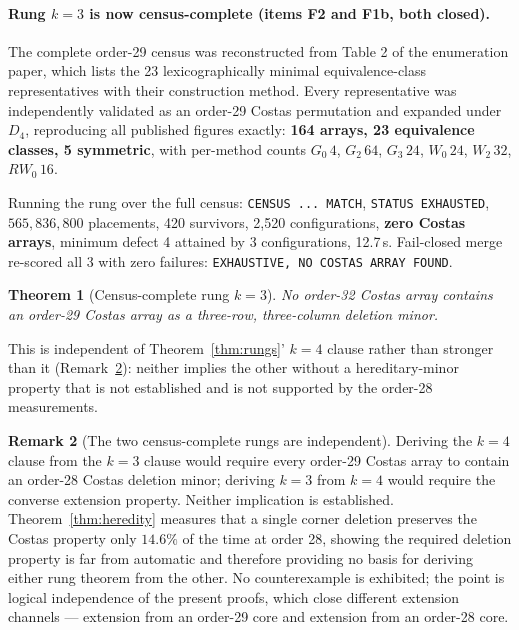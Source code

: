 \documentclass[11pt,a4paper]{article}
\newtheorem{theorem}{Theorem}[section]
\theoremstyle{definition}
\newtheorem{remark}[theorem]{Remark}
\begin{document}
\paragraph{Rung $k=3$ is now census-complete (items F2 and F1b, both closed).}
The complete order-29 census was reconstructed from Table 2 of the enumeration
paper, which lists the 23 lexicographically minimal equivalence-class
representatives with their construction method. Every representative was
independently validated as an order-29 Costas permutation and expanded under
$D_4$, reproducing all published figures exactly: \textbf{164 arrays, 23
equivalence classes, 5 symmetric}, with per-method counts
$G_0\,4$, $G_2\,64$, $G_3\,24$, $W_0\,24$, $W_2\,32$, $RW_0\,16$.

Running the rung over the full census: \texttt{CENSUS ... MATCH}, \texttt{STATUS
EXHAUSTED}, $565{,}836{,}800$ placements, 420 survivors, 2{,}520 configurations,
\textbf{zero Costas arrays}, minimum defect 4 attained by 3 configurations,
12.7\,s. Fail-closed merge re-scored all 3 with zero failures:
\texttt{EXHAUSTIVE, NO COSTAS ARRAY FOUND}.

\begin{theorem}[Census-complete rung $k=3$]
\label{thm:rung3census}
No order-32 Costas array contains an order-29 Costas array as a three-row,
three-column deletion minor.
\end{theorem}

This is independent of Theorem~\ref{thm:rungs}' $k=4$ clause rather than stronger
than it (Remark~\ref{rem:independent}): neither implies the other without a
hereditary-minor property that is not established and is not supported by the
order-28 measurements.

\begin{remark}[The two census-complete rungs are independent]
\label{rem:independent}
Deriving the $k=4$ clause from the $k=3$ clause would require every order-29
Costas array to contain an order-28 Costas deletion minor; deriving $k=3$ from
$k=4$ would require the converse extension property. Neither implication is
established. Theorem~\ref{thm:heredity} measures that a single corner deletion
preserves the Costas property only $14.6\%$ of the time at order 28, showing the
required deletion property is far from automatic and therefore providing no basis
for deriving either rung theorem from the other. No counterexample is exhibited;
the point is logical independence of the present proofs, which close different
extension channels --- extension from an order-29 core and extension from an
order-28 core.
\end{remark}
\end{document}
